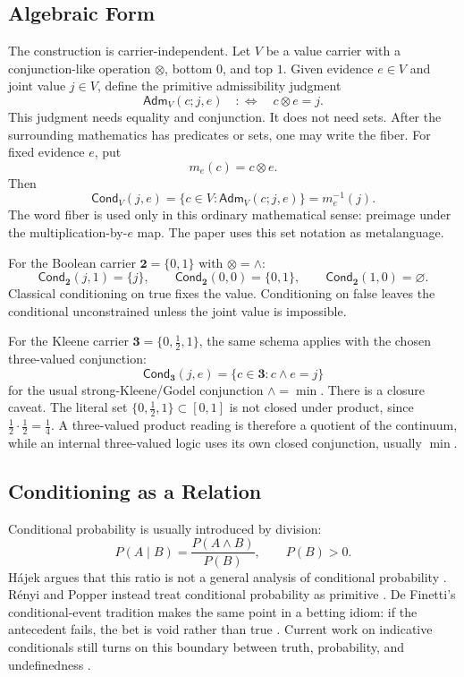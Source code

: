 \documentclass[11pt,a4paper]{article}
\newcommand{\Cond}{\mathsf{Cond}}
\newcommand{\Adm}{\mathsf{Adm}}
\newcommand{\conjc}{\otimes}
\newcommand{\half}{\tfrac12}
\newcommand{\quarter}{\tfrac14}
\newcommand{\three}{\mathbf{3}}
\begin{document}
\subsection{Algebraic Form}

The construction is carrier-independent.  Let $V$ be a value carrier
with a conjunction-like operation $\conjc$, bottom $0$, and top $1$.
Given evidence $e\in V$ and joint value $j\in V$, define the primitive
admissibility judgment
\[
  \Adm_V(c;j,e)\quad:\Longleftrightarrow\quad c\conjc e=j.
\]
This judgment needs equality and conjunction.  It does not need sets.
After the surrounding mathematics has predicates or sets, one may
write the fiber.  For fixed evidence $e$, put
\[
  m_e(c)=c\conjc e.
\]
Then
\[
  \Cond_V(j,e)=\{c\in V:\Adm_V(c;j,e)\}=m_e^{-1}(j).
\]
The word fiber is used only in this ordinary mathematical sense:
preimage under the multiplication-by-$e$ map.  The paper uses this set
notation as metalanguage.

For the Boolean carrier $\mathbf 2=\{0,1\}$ with $\conjc=\wedge$:
\[
  \Cond_{\mathbf 2}(j,1)=\{j\},\qquad
  \Cond_{\mathbf 2}(0,0)=\{0,1\},\qquad
  \Cond_{\mathbf 2}(1,0)=\varnothing.
\]
Classical conditioning on true fixes the value.  Conditioning on
false leaves the conditional unconstrained unless the joint value is
impossible.

For the Kleene carrier $\three=\{0,\half,1\}$, the same schema applies
with the chosen three-valued conjunction:
\[
  \Cond_{\three}(j,e)=\{c\in\three:c\wedge e=j\}
\]
for the usual strong-Kleene/Godel conjunction $\wedge=\min$.
There is a closure caveat.  The literal set
$\{0,\half,1\}\subset[0,1]$ is not closed under product, since
$\half\cdot\half=\quarter$.  A three-valued product reading is
therefore a quotient of the continuum, while an internal three-valued
logic uses its own closed conjunction, usually $\min$.

\subsection{Conditioning as a Relation}

Conditional probability is usually introduced by division:
\[
  P(A\mid B)=\frac{P(A\land B)}{P(B)},\qquad P(B)>0.
\]
H\'ajek argues that this ratio is not a general analysis of
conditional probability \cite{hajek2003conditional}.  R\'enyi and
Popper instead treat conditional probability as primitive
\cite{renyi1955,popper1959,krauss1968,dubins1975}.  De Finetti's
conditional-event tradition makes the same point in a betting idiom:
if the antecedent fails, the bet is void rather than true
\cite{definetti1936,egre2020part1,egre2021}.  Current work on
indicative conditionals still turns on this boundary between truth,
probability, and undefinedness \cite{egre2025}.
\end{document}
